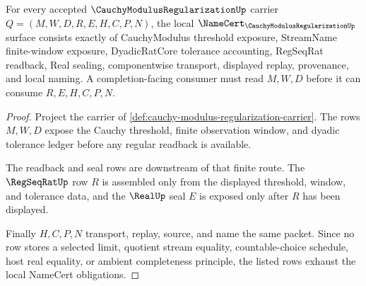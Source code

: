 \begin{theorem}
\label{thm:cauchy-modulus-regularization-namecert-obligations}
For every accepted $\CauchyModulusRegularizationUp$ carrier $Q=(M,W,D,R,E,H,C,P,N)$, the local $\NameCert_{\CauchyModulusRegularizationUp}$ surface consists exactly of CauchyModulus threshold exposure, StreamName finite-window exposure, DyadicRatCore tolerance accounting, RegSeqRat readback, Real sealing, componentwise transport, displayed replay, provenance, and local naming. A completion-facing consumer must read $M,W,D$ before it can consume $R,E,H,C,P,N$.
\end{theorem}
\begin{proof}
Project the carrier of \autoref{def:cauchy-modulus-regularization-carrier}. The rows $M,W,D$ expose the Cauchy threshold, finite observation window, and dyadic tolerance ledger before any regular readback is available.

The readback and seal rows are downstream of that finite route. The $\RegSeqRatUp$ row $R$ is assembled only from the displayed threshold, window, and tolerance data, and the $\RealUp$ seal $E$ is exposed only after $R$ has been displayed.

Finally $H,C,P,N$ transport, replay, source, and name the same packet. Since no row stores a selected limit, quotient stream equality, countable-choice schedule, host real equality, or ambient completeness principle, the listed rows exhaust the local NameCert obligations.
\end{proof}

